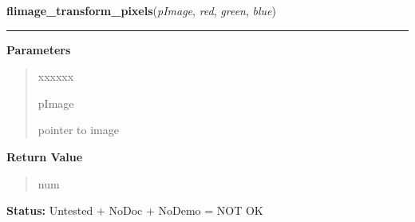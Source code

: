\hspace{.8\funcindent}\begin{boxedminipage}{\funcwidth}

    \raggedright \textbf{flimage\_transform\_pixels}(\textit{pImage}, \textit{red}, \textit{green}, \textit{blue})

    \vspace{-1.5ex}

    \rule{\textwidth}{0.5\fboxrule}
\setlength{\parskip}{2ex}
\setlength{\parskip}{1ex}
      \textbf{Parameters}
      \vspace{-1ex}

      \begin{quote}
        \begin{Ventry}{xxxxxx}

          \item[pImage]

          pointer to image

        \end{Ventry}

      \end{quote}

      \textbf{Return Value}
    \vspace{-1ex}

      \begin{quote}
      num

      \end{quote}

\textbf{Status:} Untested + NoDoc + NoDemo = NOT OK



    \end{boxedminipage}

    \label{xformslib:library:flimage_windowlevel}

    \vspace{0.5ex}

